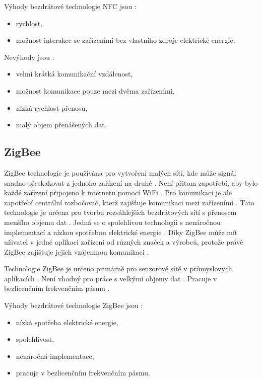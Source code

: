 Výhody bezdrátové technologie NFC jsou \cite{Bezdrat_muni}:
\begin{itemize}
  \item rychlost, %
  \item možnost interakce se zařízeními bez vlastního zdroje elektrické energie.
\end{itemize}

Nevýhody jsou \cite{Bezdrat_muni}:
\begin{itemize}
  \item velmi krátká komunikační vzdálenost,
  \item možnost komunikace pouze mezi dvěma zařízeními, 
  \item nízká rychlost přenosu,
  \item malý objem přenášených dat.
\end{itemize}

\subsection{ZigBee} %
ZigBee technologie je používána pro vytvoření malých sítí, kde může signál snadno přeskakovat z jednoho zařízení na druhé \cite{ZigBee_smart}.
Není přitom zapotřebí, aby bylo každé zařízení připojeno k internetu pomocí WiFi \cite{ZigBee_smart}. Pro komunikaci je ale zapotřebí centrální 
rozbočovač, kterž zajišťuje komunikaci mezi zařízeními \cite{ZigBee_smart}. Tato technologie je určena pro tvorbu rozsáhlejších bezdrátových sítí
s přenosem menšího objemu dat \cite{ZigBee_smart}. Jedná se o spolehlivou technologii s nenáročnou implementací a nízkou spotřebou elektrické energie 
\cite{ZigBee_smart}. Díky ZigBee může mít uživatel v jedné aplikaci zařízení 
od různých značek a výrobců, protože právě ZigBee zajišťuje jejich vzájemnou komunikaci \cite{ZigBee_smart}.

Technologie ZigBee je určeno primárně pro senzorové sítě v průmyslových aplikacích \cite{Bezdrat_muni}. Není vhodný pro práce s velkými objemy dat \cite{Bezdrat_muni}.
Pracuje v bezlicenčním frekvenčním pásmu \cite{Bezdrat_muni}.


Výhody bezdrátové technologie ZigBee jsou \cite{ZigBee_smart}:
\begin{itemize}
  \item nízká spotřeba elektrické energie,
  \item spolehlivost, 
  \item nenáročná implementace,
  \item pracuje v bezlicenčním frekvenčním pásmu. 
\end{itemize}


